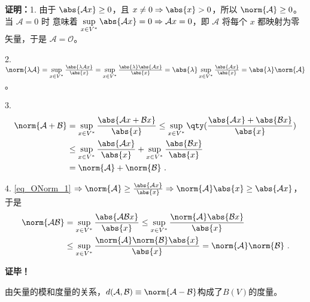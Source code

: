 \textbf{证明：}1. 由于 $\abs{\mathcal A x}\geq0$，且 $x\neq0\Rightarrow\abs{x}>0$，所以
$\norm{\mathcal A}\geq0$。当 $\mathcal A=0$ 时 意味着 $\sup\limits_{x\in{V^*}}\abs{\mathcal A x}=0\Rightarrow\mathcal A x=0$，即 $\mathcal A$ 将每个 $x$ 都映射为零矢量，于是 $\mathcal A=\mathcal O$。

2.$\norm{\lambda\mathcal A}=\sup\limits_{x\in{V^*}}\frac{\abs{\lambda \mathcal Ax}}{\abs{x}}=\sup\limits_{x\in{V^*}}\frac{\abs{\lambda}\abs{ \mathcal Ax}}{\abs{x}}=\abs{\lambda}\sup\limits_{x\in{V^*}}\frac{\abs{\mathcal Ax}}{\abs{x}}=\abs{\lambda}\norm{\mathcal A}
$。

3.\begin{equation}
\begin{aligned}
\norm{\mathcal A+\mathcal B}&=\sup\limits_{x\in{V^*}}\frac{\abs{\mathcal Ax+\mathcal B x}}{\abs{x}}\leq\sup\limits_{x\in{V^*}}\qty(\frac{\abs{\mathcal Ax}+\abs{\mathcal B x}}{\abs{x}})\\
&\leq \sup\limits_{x\in{V^*}}\frac{\abs{ \mathcal Ax}}{\abs{x}}+\sup\limits_{x\in{V^*}}\frac{\abs{\mathcal B x}}{\abs{x}}\\
&=\norm{\mathcal A}+\norm{\mathcal B}~.
\end{aligned}
\end{equation}

4. \autoref{eq_ONorm_1} $\Rightarrow\norm{\mathcal A}\geq\frac{\abs{\mathcal Ax}}{\abs{x}}\Rightarrow \norm{\mathcal A}\abs{x}\geq\abs{\mathcal A x}$，于是
\begin{equation}
\begin{aligned}
\norm{\mathcal{AB}}&=\sup\limits_{x\in{V^*}}\frac{\abs{\mathcal{AB} x}}{\abs{x}}\leq\sup\limits_{x\in{V^*}}\frac{\norm{\mathcal A}\abs{\mathcal{B} x}}{\abs{x}}\\
&\leq\sup\limits_{x\in{V^*}}\frac{\norm{\mathcal A}\norm{\mathcal B}\abs{x}}{\abs{x}}=\norm{\mathcal A}\norm{\mathcal B}~.
\end{aligned}
\end{equation}

\textbf{证毕！}

由矢量的模和度量的关系，$d(\mathcal A,\mathcal B)\equiv\norm{\mathcal{A-B}}$构成了$B(V)$的度量。


